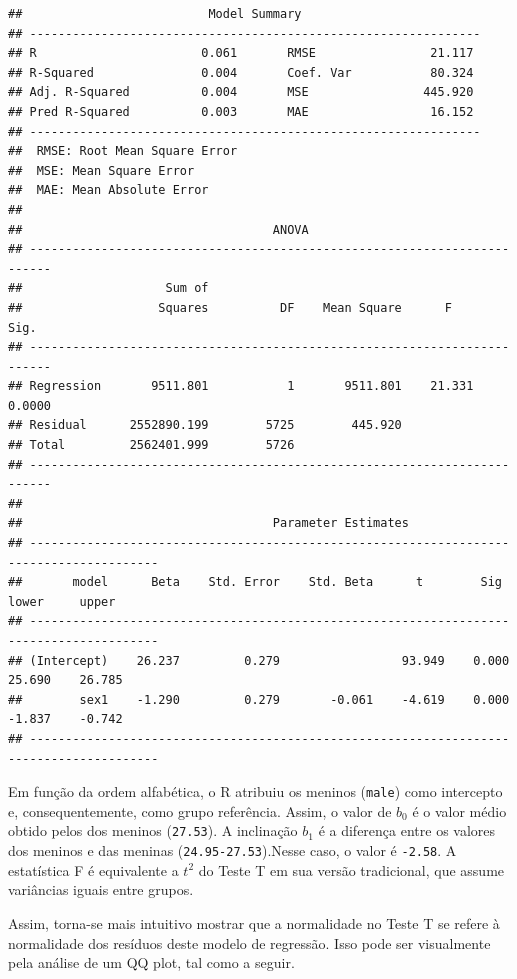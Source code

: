 \documentclass[
]{book}
\begin{document}
\begin{verbatim}
##                          Model Summary                          
## ---------------------------------------------------------------
## R                       0.061       RMSE                21.117 
## R-Squared               0.004       Coef. Var           80.324 
## Adj. R-Squared          0.004       MSE                445.920 
## Pred R-Squared          0.003       MAE                 16.152 
## ---------------------------------------------------------------
##  RMSE: Root Mean Square Error 
##  MSE: Mean Square Error 
##  MAE: Mean Absolute Error 
## 
##                                   ANOVA                                   
## -------------------------------------------------------------------------
##                    Sum of                                                
##                   Squares          DF    Mean Square      F         Sig. 
## -------------------------------------------------------------------------
## Regression       9511.801           1       9511.801    21.331    0.0000 
## Residual      2552890.199        5725        445.920                     
## Total         2562401.999        5726                                    
## -------------------------------------------------------------------------
## 
##                                   Parameter Estimates                                    
## ----------------------------------------------------------------------------------------
##       model      Beta    Std. Error    Std. Beta      t        Sig      lower     upper 
## ----------------------------------------------------------------------------------------
## (Intercept)    26.237         0.279                 93.949    0.000    25.690    26.785 
##        sex1    -1.290         0.279       -0.061    -4.619    0.000    -1.837    -0.742 
## ----------------------------------------------------------------------------------------
\end{verbatim}

Em função da ordem alfabética, o R atribuiu os meninos (\texttt{male})
como intercepto e, consequentemente, como grupo referência. Assim, o
valor de \(b_0\) é o valor médio obtido pelos dos meninos
(\texttt{27.53}). A inclinação \(b_1\) é a diferença entre os valores
dos meninos e das meninas (\texttt{24.95-27.53}).Nesse caso, o valor é
\texttt{-2.58}. A estatística F é equivalente a \(t^2\) do Teste T em
sua versão tradicional, que assume variâncias iguais entre grupos.

Assim, torna-se mais intuitivo mostrar que a normalidade no Teste T se
refere à normalidade dos resíduos deste modelo de regressão. Isso pode
ser visualmente pela análise de um QQ plot, tal como a seguir.
\end{document}

